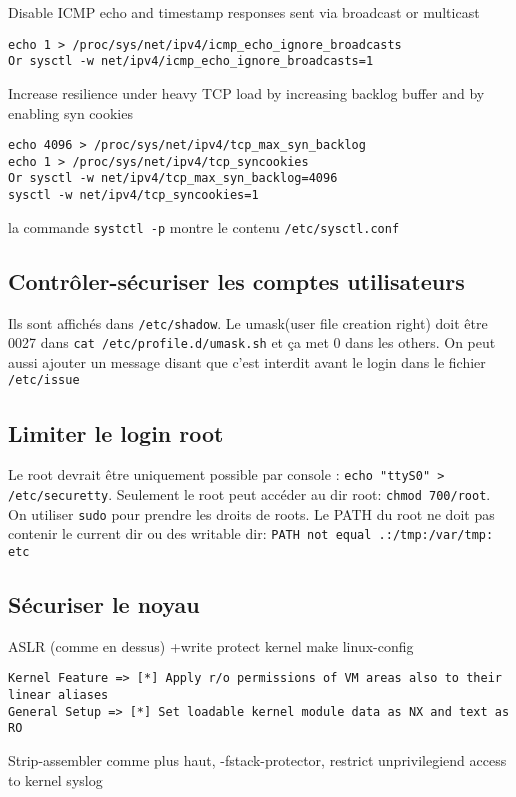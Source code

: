 Disable ICMP echo and timestamp responses sent via broadcast or multicast
\begin{Verbatim}[breaklines=true, breakanywhere=true]
echo 1 > /proc/sys/net/ipv4/icmp_echo_ignore_broadcasts
Or sysctl -w net/ipv4/icmp_echo_ignore_broadcasts=1
\end{Verbatim}
Increase resilience under heavy TCP load by increasing backlog buffer and by enabling 
syn cookies
\begin{Verbatim}[breaklines=true, breakanywhere=true]
echo 4096 > /proc/sys/net/ipv4/tcp_max_syn_backlog
echo 1 > /proc/sys/net/ipv4/tcp_syncookies
Or sysctl -w net/ipv4/tcp_max_syn_backlog=4096
sysctl -w net/ipv4/tcp_syncookies=1
\end{Verbatim}
la commande \verb!systctl -p! montre le contenu \verb!/etc/sysctl.conf!

\subsection{Contrôler-sécuriser les comptes utilisateurs}
Ils sont affichés dans \verb!/etc/shadow!. Le umask(user file creation right) doit être 0027 dans \verb!cat /etc/profile.d/umask.sh! et ça met 0 dans les others.
On peut aussi ajouter un message disant que c'est interdit avant le login dans le fichier \verb!/etc/issue!

\subsection{Limiter le login root}
Le root devrait être uniquement possible par console : \verb!echo "ttyS0" > /etc/securetty!. Seulement le root peut accéder au dir root: \verb!chmod 700/root!. On utiliser \verb!sudo! pour prendre les droits de roots. Le PATH du root ne doit pas contenir le current dir ou des writable dir: \verb!PATH not equal .:/tmp:/var/tmp: etc! 
\subsection{Sécuriser le noyau}
ASLR (comme en dessus) +write protect kernel make linux-config
\begin{Verbatim}[breaklines=true, breakanywhere=true]
Kernel Feature => [*] Apply r/o permissions of VM areas also to their linear aliases
General Setup => [*] Set loadable kernel module data as NX and text as RO
\end{Verbatim}
Strip-assembler comme plus haut, -fstack-protector, restrict unprivilegiend access to kernel syslog

